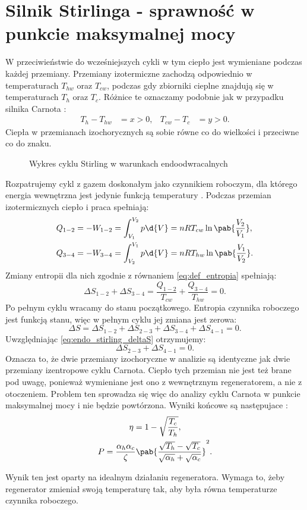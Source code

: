 
\section{Silnik Stirlinga - sprawność w punkcie maksymalnej mocy}
W przeciwieństwie do wcześniejszych cykli w tym ciepło jest wymieniane podczas każdej przemiany. Przemiany izotermiczne zachodzą odpowiednio w temperaturach \(T_{hw}\) oraz \(T_{cw}\), podczas gdy zbiorniki cieplne znajdują się w temperaturach \(T_{h}\) oraz \(T_{c}\). Różnice te oznaczamy podobnie jak w przypadku silnika Carnota \cite{endo_stirling}:
\begin{align}
	T_h - T_{hw} &= x > 0, & T_{cw} - T_c &= y > 0.
\end{align}
Ciepła w przemianach izochorycznych są sobie równe co do wielkości i przeciwne co do znaku.

\begin{figure}[htp]
	\centering
	
	\caption{Wykres cyklu Stirling w warunkach endoodwracalnych}
\end{figure}

Rozpatrujemy cykl z gazem doskonałym jako czynnikiem roboczym, dla którego energia wewnętrzna jest jedynie funkcją temperatury \cite{b:kondepudi_prigogine_modern_thermodynamics}. Podczas przemian izotermicznych ciepło i praca spełniają:
\begin{align}
	Q_{1-2} &= - W_{1-2} = \int_{V_1}^{V_2} p\d{V} = nRT_{cw}\ln\pab{\frac{V_2}{V_1}}, \\
	Q_{3-4} &= - W_{3-4} = \int_{V_2}^{V_1} p\d{V} = nRT_{hw}\ln\pab{\frac{V_1}{V_2}}.
\end{align}
Zmiany entropii dla nich zgodnie z równaniem \eqref{eq:def_entropia} spełniają:
\begin{equation}\label{eq:endo_stirling_deltaS}
	\Delta S_{1-2} + \Delta S_{3-4} = \frac{Q_{1-2}}{T_{cw}} + \frac{Q_{3-4}}{T_{hw}} = 0.
\end{equation}
Po pełnym cyklu wracamy do stanu początkowego. Entropia czynnika roboczego jest funkcją stanu, więc w pełnym cyklu jej zmiana jest zerowa:
\begin{equation}
	\Delta S = \Delta S_{1-2} + \Delta S_{2-3} + \Delta S_{3-4} + \Delta S_{4-1} = 0.
\end{equation}
Uwzględniając \eqref{eq:endo_stirling_deltaS} otrzymujemy:
\begin{equation}
	\Delta S_{2-3} + \Delta S_{4-1} = 0.
\end{equation}
Oznacza to, że dwie przemiany izochoryczne w analizie są identyczne jak dwie przemiany izentropowe cyklu Carnota. Ciepło tych przemian nie jest też brane pod uwagę, ponieważ wymieniane jest ono z wewnętrznym regeneratorem, a nie z otoczeniem. Problem ten sprowadza się więc do analizy cyklu Carnota w punkcie maksymalnej mocy i nie będzie powtórzona. Wyniki końcowe są następujace \cite{endo_stirling}:
\begin{gather}
	\eta = 1 - \sqrt{\frac{T_c}{T_h}}, \\
	P = \frac{\alpha_h \alpha_c}{\zeta} \pab{\frac{\sqrt{T_h} - \sqrt{T_c}}{\sqrt{\alpha_h} + \sqrt{\alpha_c}}}^2.
\end{gather}

Wynik ten jest oparty na idealnym działaniu regeneratora. Wymaga to, żeby regenerator zmieniał swoją temperaturę tak, aby była równa temperaturze czynnika roboczego.
